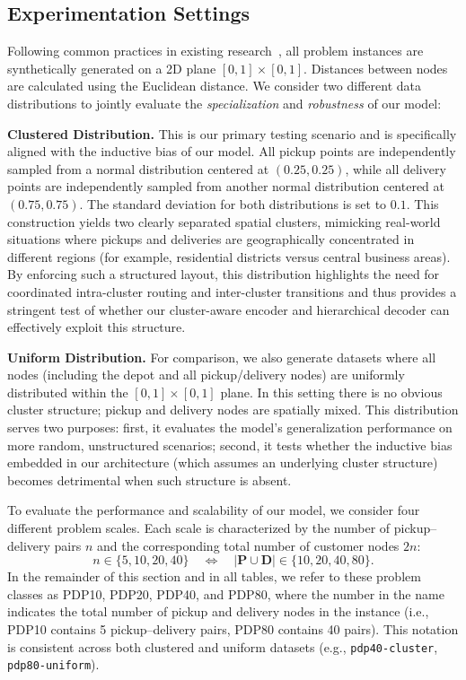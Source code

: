 \documentclass[pdflatex,sn-basic,Numbered]{sn-jnl}
\begin{document}
\subsection{Experimentation Settings}\label{subsec:exp_settings}

Following common practices in existing research~\cite{kool2019attention,kwon2020pomo}, all problem instances are synthetically generated on a 2D plane $[0, 1] \times [0, 1]$. Distances between nodes are calculated using the Euclidean distance. We consider two different data distributions to jointly evaluate the \emph{specialization} and \emph{robustness} of our model:

\textbf{Clustered Distribution.} This is our primary testing scenario and is specifically aligned with the inductive bias of our model. All pickup points are independently sampled from a normal distribution centered at $(0.25, 0.25)$, while all delivery points are independently sampled from another normal distribution centered at $(0.75, 0.75)$. The standard deviation for both distributions is set to $0.1$. This construction yields two clearly separated spatial clusters, mimicking real-world situations where pickups and deliveries are geographically concentrated in different regions (for example, residential districts versus central business areas). By enforcing such a structured layout, this distribution highlights the need for coordinated intra-cluster routing and inter-cluster transitions and thus provides a stringent test of whether our cluster-aware encoder and hierarchical decoder can effectively exploit this structure.

\textbf{Uniform Distribution.} For comparison, we also generate datasets where all nodes (including the depot and all pickup/delivery nodes) are uniformly distributed within the $[0, 1] \times [0, 1]$ plane. In this setting there is no obvious cluster structure; pickup and delivery nodes are spatially mixed. This distribution serves two purposes: first, it evaluates the model's generalization performance on more random, unstructured scenarios; second, it tests whether the inductive bias embedded in our architecture (which assumes an underlying cluster structure) becomes detrimental when such structure is absent.

To evaluate the performance and scalability of our model, we consider four different problem scales. Each scale is characterized by the number of pickup--delivery pairs $n$ and the corresponding total number of customer nodes $2n$:
\[
n \in \{5, 10, 20, 40\} \quad \Longleftrightarrow \quad |\mathbf{P} \cup \mathbf{D}| \in \{10, 20, 40, 80\}.
\]
In the remainder of this section and in all tables, we refer to these problem classes as PDP10, PDP20, PDP40, and PDP80, where the number in the name indicates the total number of pickup and delivery nodes in the instance (i.e., PDP10 contains 5 pickup--delivery pairs, PDP80 contains 40 pairs). This notation is consistent across both clustered and uniform datasets (e.g., \texttt{pdp40-cluster}, \texttt{pdp80-uniform}).
\end{document}
